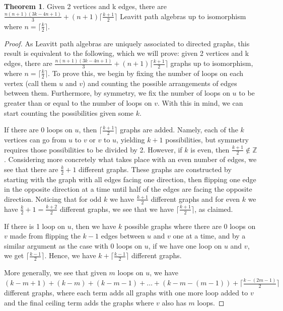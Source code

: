 \documentclass[12pt]{amsart}
\theoremstyle{plain} \numberwithin{equation}{section}
\theoremstyle{definition}
\newtheorem{thm}{Theorem}
\theoremstyle{definition}
\begin{document}
\begin{thm}
    Given 2 vertices and k edges, there are $\frac{n(n+1)(3k-4n+1)}{3}+(n+1)\lceil\frac{k+1}{2}\rceil$ Leavitt path algebras up to isomorphism where $n=\lceil\frac{k}{2}\rceil$.
\end{thm}
\begin{proof}
     As Leavitt path algebras are uniquely associated to directed graphs, this result is equivalent to the following, which we will prove: given 2 vertices and k edges, there are $\frac{n(n+1)(3k-4n+1)}{3}+(n+1)\lceil\frac{k+1}{2}\rceil$ graphs up to isomorphism, where $n=\lceil\frac{k}{2}\rceil$. To prove this, we begin by fixing the number of loops on each vertex (call them $u$ and $v$) and counting the possible arrangements of edges between them. Furthermore, by symmetry, we fix the number of loops on $u$ to be greater than or equal to the number of loops on $v$. With this in mind, we can start counting the possibilities given some $k$. 
     
    If there are 0 loops on $u$, then $\lceil\frac{k+1}{2}\rceil$ graphs are added. Namely, each of the $k$ vertices can go from $u$ to $v$ or $v$ to $u$, yielding $k+1$ possibilities, but symmetry requires those possibilities to be divided by 2. However, if $k$ is even, then $\frac{k+1}{2}\notin\mathbb{Z}$. Considering more concretely what takes place with an even number of edges, we see that there are $\frac{k}{2} + 1$ different graphs. These graphs are constructed by starting with the graph with all edges facing one direction, then flipping one edge in the opposite direction at a time until half of the edges are facing the opposite direction. Noticing that for odd $k$ we have $\frac{k+1}{2}$ different graphs and for even $k$ we have $\frac{k}{2} + 1 = \frac{k+2}{2}$ different graphs, we see that we have $\lceil\frac{k+1}{2}\rceil$, as claimed. 
    
    If there is 1 loop on $u$, then we have $k$ possible graphs where there are 0 loops on $v$ made from flipping the $k-1$ edges between $u$ and $v$ one at a time, and by a similar argument as the case with 0 loops on $u$, if we have one loop on $u$ and $v$, we get $\lceil\frac{k-1}{2}\rceil$. Hence, we have $k+\lceil\frac{k-1}{2}\rceil$ different graphs.
    
    More generally, we see that given $m$ loops on $u$, we have $(k-m+1) + (k-m) + (k-m-1) +\dots + (k-m-(m-1)) + \lceil\frac{k-(2m-1)}{2}\rceil$ different graphs, where each term adds all graphs with one more loop added to $v$ and the final ceiling term adds the graphs where $v$ also has $m$ loops.


\end{proof}
\end{document}
